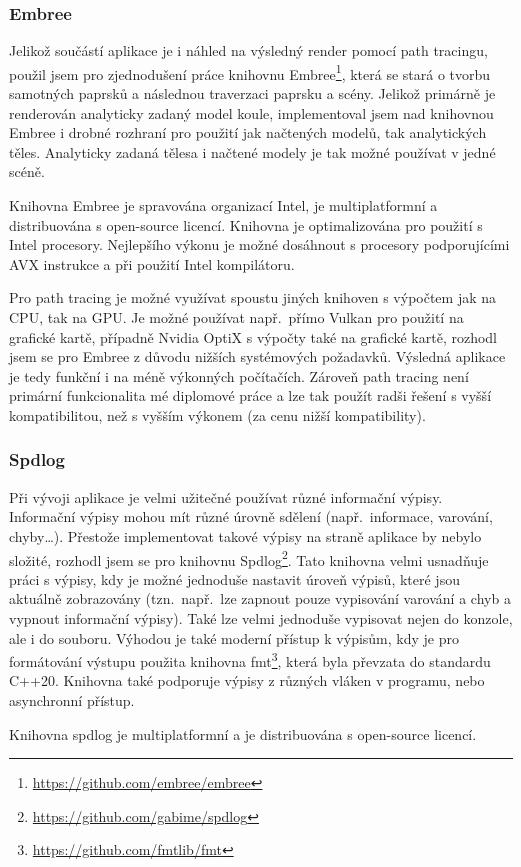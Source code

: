 \documentclass[czech,master]{diploma}
\begin{document}
\subsubsection{Embree}
Jelikož součástí aplikace je i náhled na výsledný render pomocí path tracingu, použil jsem pro zjednodušení práce knihovnu Embree\footnote{\url{https://github.com/embree/embree}}, která se stará o tvorbu samotných paprsků a následnou traverzaci paprsku a scény. Jelikož primárně je renderován analyticky zadaný model koule, implementoval jsem nad knihovnou Embree i drobné rozhraní pro použití jak načtených modelů, tak analytických těles. Analyticky zadaná tělesa i načtené modely je tak možné používat v jedné scéně. \par
Knihovna Embree je spravována organizací Intel, je multiplatformní a distribuována s open-source licencí. Knihovna je optimalizována pro použití s Intel procesory. Nejlepšího výkonu je možné dosáhnout s procesory podporujícími AVX instrukce a při použití Intel kompilátoru. \par
Pro path tracing je možné využívat spoustu jiných knihoven s výpočtem jak na CPU, tak na GPU\@. Je možné používat např.\ přímo Vulkan pro použití na grafické kartě, případně Nvidia OptiX s výpočty také na grafické kartě, rozhodl jsem se pro Embree z důvodu nižších systémových požadavků. Výsledná aplikace je tedy funkční i na méně výkonných počítačích. Zároveň path tracing není primární funkcionalita mé diplomové práce a lze tak použít radši řešení s vyšší kompatibilitou, než s vyšším výkonem (za cenu nižší kompatibility).

\subsubsection{Spdlog}
Při vývoji aplikace je velmi užitečné používat různé informační výpisy. Informační výpisy mohou mít různé úrovně sdělení (např.\ informace, varování, chyby\dots). Přestože implementovat takové výpisy na straně aplikace by nebylo složité, rozhodl jsem se pro knihovnu Spdlog\footnote{\url{https://github.com/gabime/spdlog}}. Tato knihovna velmi usnadňuje práci s výpisy, kdy je možné jednoduše nastavit úroveň výpisů, které jsou aktuálně zobrazovány (tzn.\ např.\ lze zapnout pouze vypisování varování a chyb a vypnout informační výpisy). Také lze velmi jednoduše vypisovat nejen do konzole, ale i do souboru. Výhodou je také moderní přístup k výpisům, kdy je pro formátování výstupu použita knihovna fmt\footnote{\url{https://github.com/fmtlib/fmt}}, která byla převzata do standardu C++20. Knihovna také podporuje výpisy z různých vláken v programu, nebo asynchronní přístup. \par
Knihovna spdlog je multiplatformní a je distribuována s open-source licencí.
\clearpage
\end{document}

